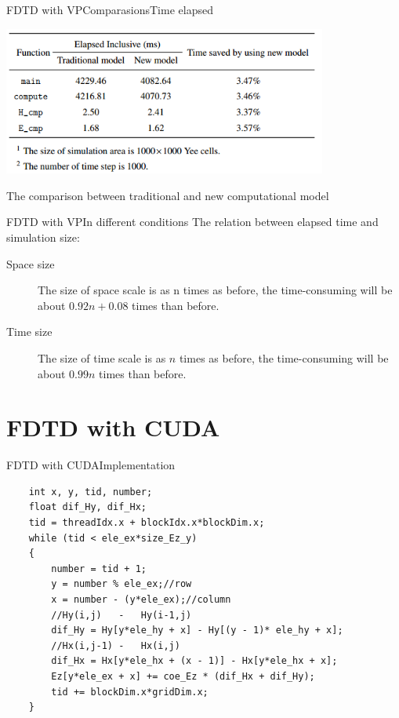 \documentclass[11pt]{beamer}
\begin{document}
	\begin{frame}{FDTD with VP}{Comparasions}{Time elapsed}
		\begin{table}
			\includegraphics[width=0.8\textwidth]{vprlst}
			\caption{The comparison between traditional and new computational model}
		\end{table}
	\end{frame}
	
	\begin{frame}{FDTD with VP}{In different conditions}
		The relation between elapsed time and simulation size:
		\begin{description}
			\item[Space size] The size of space scale is as
			n times as before, the time-consuming will be about $0.92n + 0.08$ times than before.
			\item[Time size] The size of time scale is as
			$n$ times as before, the time-consuming will be about $0.99n$ times than before.
		\end{description}
	\end{frame}
	
	\section{FDTD with CUDA}
	\begin{frame}[containsverbatim]{FDTD with CUDA}{Implementation}
	\begin{lstlisting}
	int x, y, tid, number;
	float dif_Hy, dif_Hx;
	tid = threadIdx.x + blockIdx.x*blockDim.x;
	while (tid < ele_ex*size_Ez_y)
	{
		number = tid + 1;
		y = number % ele_ex;//row
		x = number - (y*ele_ex);//column
		//Hy(i,j)	-	Hy(i-1,j)
		dif_Hy = Hy[y*ele_hy + x] - Hy[(y - 1)* ele_hy + x];
		//Hx(i,j-1)	-	Hx(i,j)
		dif_Hx = Hx[y*ele_hx + (x - 1)] - Hx[y*ele_hx + x];
		Ez[y*ele_ex + x] += coe_Ez * (dif_Hx + dif_Hy);
		tid += blockDim.x*gridDim.x;
	}
	\end{lstlisting}
	\end{frame}
	
\end{document}
